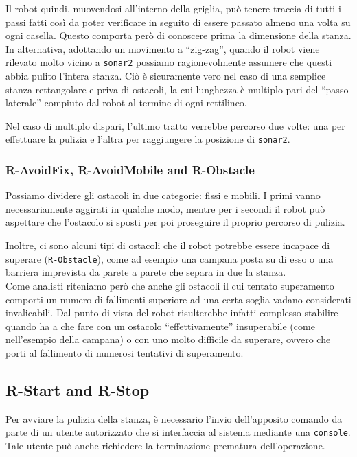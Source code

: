 \documentclass{../llncs}
\newcommand{\code}[1]{{\color{blue}\small{\texttt{#1}}}}
\begin{document}
Il robot quindi, muovendosi all'interno della griglia, può tenere traccia di tutti i passi fatti così da poter verificare in seguito di essere passato almeno una volta su ogni casella. Questo comporta però di conoscere prima la dimensione della stanza.\\

In alternativa, adottando un movimento a ``zig-zag'', quando il robot viene rilevato molto vicino a \code{sonar2} possiamo ragionevolmente assumere che questi abbia pulito l'intera stanza. Ciò è sicuramente vero nel caso di una semplice stanza rettangolare e priva di ostacoli, la cui lunghezza è multiplo pari del ``passo laterale'' compiuto dal robot al termine di ogni rettilineo.

Nel caso di multiplo dispari, l'ultimo tratto verrebbe percorso due volte: una per effettuare la pulizia e l'altra per raggiungere la posizione di \code{sonar2}.

\subsubsection{R-AvoidFix, R-AvoidMobile and R-Obstacle}
Possiamo dividere gli ostacoli in due categorie: fissi e mobili. I primi vanno necessariamente aggirati in qualche modo, mentre per i secondi il robot può aspettare che l'ostacolo si sposti per poi proseguire il proprio percorso di pulizia.

Inoltre, ci sono alcuni tipi di ostacoli che il robot potrebbe essere incapace di superare (\code{R-Obstacle}), come ad esempio una campana posta su di esso o una barriera imprevista da parete a parete che separa in due la stanza.\\

Come analisti riteniamo però che anche gli ostacoli il cui tentato superamento comporti un numero di fallimenti superiore ad una certa soglia vadano considerati invalicabili. Dal punto di vista del robot risulterebbe infatti complesso stabilire quando ha a che fare con un ostacolo ``effettivamente'' insuperabile (come nell'esempio della campana) o con uno molto difficile da superare, ovvero che porti al fallimento di numerosi tentativi di superamento.

\subsection{R-Start and R-Stop}
Per avviare la pulizia della stanza, è necessario l'invio dell'apposito comando da parte di un utente autorizzato che si interfaccia al sistema mediante una \code{console}. Tale utente può anche richiedere la terminazione prematura dell'operazione.
\end{document}

